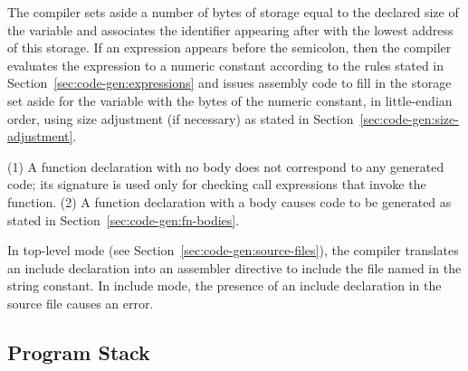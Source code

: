 \documentclass[10pt]{article}
\begin{document}
 The compiler sets aside a
number of bytes of storage equal to the declared size of the variable
and associates the identifier appearing after  with the
lowest address of this storage.  If an expression appears before the
semicolon, then the compiler evaluates the expression to a numeric
constant according to the rules stated in
Section~\ref{sec:code-gen:expressions} and issues assembly code to
fill in the storage set aside for the variable with the bytes of the
numeric constant, in little-endian order, using size adjustment (if
necessary) as stated in Section~\ref{sec:code-gen:size-adjustment}.

 (1) A function declaration with no
body does not correspond to any generated code; its signature is used
only for checking call expressions that invoke the function.  (2) A
function declaration with a body causes code to be generated as stated
in Section~\ref{sec:code-gen:fn-bodies}.

  In top-level mode (see
Section~\ref{sec:code-gen:source-files}), the compiler translates an
include declaration into an assembler directive to include the file
named in the string constant.  In include mode, the presence of an
include declaration in the source file causes an error.

\subsection{Program Stack}
\label{sec:code-gen:program-stack}
\end{document}
